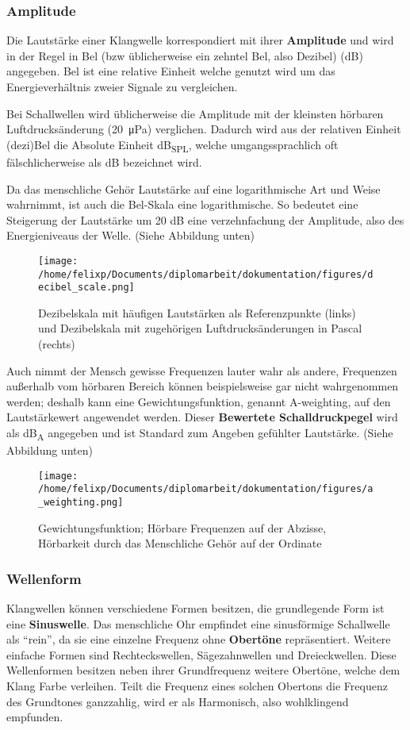 \subsubsection{Amplitude}
\label{sec:orge795cca}
Die Lautstärke einer Klangwelle korrespondiert mit ihrer \textbf{Amplitude} und wird in der Regel in Bel (bzw üblicherweise ein zehntel Bel, also Dezibel) (\si{\dB}) angegeben. Bel ist eine relative Einheit welche genutzt wird um das Energieverhältnis zweier Signale zu vergleichen.

Bei Schallwellen wird üblicherweise die Amplitude mit der kleinsten hörbaren Luftdrucksänderung (\SI{20}{\micro\pascal}) verglichen. Dadurch wird aus der relativen Einheit (dezi)Bel die Absolute Einheit \si{\dB}\textsubscript{SPL}, welche umgangssprachlich oft fälschlicherweise als \si{\dB} bezeichnet wird.

Da das menschliche Gehör Lautstärke auf eine logarithmische Art und Weise wahrnimmt, ist auch die Bel-Skala eine logarithmische. So bedeutet eine Steigerung der Lautstärke um 20 \si{\dB} eine verzehnfachung der Amplitude, also des Energieniveaus der Welle. (Siehe Abbildung unten)

\begin{figure}[htbp]
\centering
\texttt{[image: /home/felixp/Documents/diplomarbeit/dokumentation/figures/decibel\_scale.png]}
\caption{Dezibelskala mit häufigen Lautstärken als Referenzpunkte (links) und Dezibelskala mit zugehörigen Luftdrucksänderungen in Pascal (rechts)}
\end{figure}

Auch nimmt der Mensch gewisse Frequenzen lauter wahr als andere, Frequenzen außerhalb vom hörbaren Bereich können beispielsweise gar nicht wahrgenommen werden; deshalb kann eine Gewichtungsfunktion, genannt A-weighting, auf den Lautstärkewert angewendet werden. Dieser \textbf{Bewertete Schalldruckpegel} wird als \si{\dB}\textsubscript{A} angegeben und ist Standard zum Angeben gefühlter Lautstärke. (Siehe Abbildung unten)

\begin{figure}[htbp]
\centering
\texttt{[image: /home/felixp/Documents/diplomarbeit/dokumentation/figures/a\_weighting.png]}
\caption{Gewichtungsfunktion; Hörbare Frequenzen auf der Abzisse, Hörbarkeit durch das Menschliche Gehör auf der Ordinate}
\end{figure}

\subsubsection{Wellenform}
\label{sec:orgc946906}
Klangwellen können verschiedene Formen besitzen, die grundlegende Form ist eine \textbf{Sinuswelle}. Das menschliche Ohr empfindet eine sinusförmige Schallwelle als "`rein"', da sie eine einzelne Frequenz ohne \textbf{Obertöne} repräsentiert. Weitere einfache Formen sind Rechteckswellen, Sägezahnwellen und Dreieckwellen. Diese Wellenformen besitzen neben ihrer Grundfrequenz weitere Obertöne, welche dem Klang Farbe verleihen. Teilt die Frequenz eines solchen Obertons die Frequenz des Grundtones ganzzahlig, wird er als Harmonisch, also wohlklingend empfunden.

